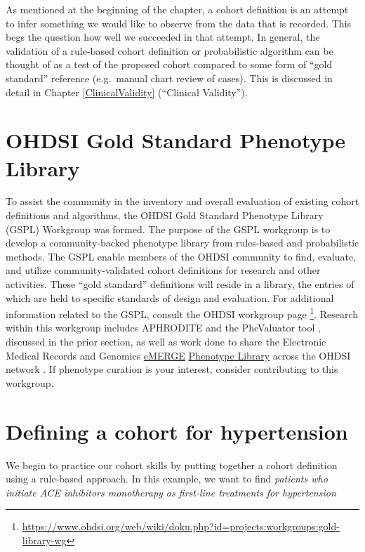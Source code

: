 \documentclass[11pt]{book}
\let\rmarkdownfootnote\footnote%
\def\footnote{\protect\rmarkdownfootnote}
\theoremstyle{definition}
\theoremstyle{definition}
\theoremstyle{definition}
\theoremstyle{remark}
\begin{document}
As mentioned at the beginning of the chapter, a cohort definition is an attempt to infer something we would like to observe from the data that is recorded. This begs the question how well we succeeded in that attempt. In general, the validation of a rule-based cohort definition or probabilistic algorithm can be thought of as a test of the proposed cohort compared to some form of ``gold standard'' reference (e.g.~manual chart review of cases). This is discussed in detail in Chapter \ref{ClinicalValidity} (``Clinical Validity'').

\hypertarget{ohdsi-gold-standard-phenotype-library}{%
\section{OHDSI Gold Standard Phenotype Library}\label{ohdsi-gold-standard-phenotype-library}}

To assist the community in the inventory and overall evaluation of existing cohort definitions and algorithms, the OHDSI Gold Standard Phenotype Library (GSPL) Workgroup was formed. The purpose of the GSPL workgroup is to develop a community-backed phenotype library from rules-based and probabilistic methods. The GSPL enable members of the OHDSI community to find, evaluate, and utilize community-validated cohort definitions for research and other activities. These ``gold standard'' definitions will reside in a library, the entries of which are held to specific standards of design and evaluation. For additional information related to the GSPL, consult the OHDSI workgroup page \footnote{\url{https://www.ohdsi.org/web/wiki/doku.php?id=projects:workgroups:gold-library-wg}}. Research within this workgroup includes APHRODITE \citep{Banda2017APHRODITE} and the PheValuator tool \citep{Swerdel2019phevaluator} , discussed in the prior section, as well as work done to share the Electronic Medical Records and Genomics \href{https://emerge.mc.vanderbilt.edu/}{eMERGE} \href{https://phekb.org/phenotypes}{Phenotype Library} across the OHDSI network \citep{Hripcsak2019eMERGE}. If phenotype curation is your interest, consider contributing to this workgroup. 

\hypertarget{defining-a-cohort-for-hypertension}{%
\section{Defining a cohort for hypertension}\label{defining-a-cohort-for-hypertension}}

We begin to practice our cohort skills by putting together a cohort definition using a rule-based approach. In this example, we want to find \emph{patients who initiate ACE inhibitors monotherapy as first-line treatments for hypertension}
\end{document}
